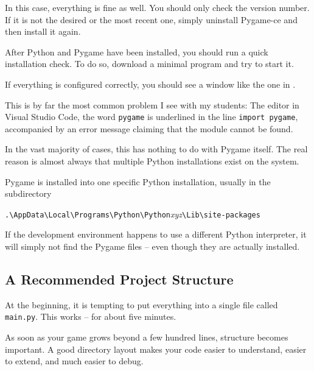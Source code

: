 In this case, everything is fine as well. You should only check the version number. If it is not the desired or the most recent one, simply uninstall Pygame-ce and then install it again.

After Python and Pygame have been installed, you should run a quick installation check. To do so, download a minimal program and try to start it.


If everything is configured correctly, you should see a window like the one in .


\begin{hintbox}
	This is by far the most common problem I see with my students: The editor in Visual Studio Code, the word \texttt{pygame} is underlined in the line \texttt{import pygame}, accompanied by an error message claiming that the module cannot be found.

	In the vast majority of cases, this has nothing to do with Pygame itself. The real reason is almost always that multiple Python installations exist on the system.

	Pygame is installed into one specific Python installation, usually in the subdirectory

	\verb+.\AppData\Local\Programs\Python\Python+\emph{xyz}\verb+\Lib\site-packages+

	If the development environment happens to use a different Python interpreter, it will simply not find the Pygame files -- even though they are actually installed.
\end{hintbox}


\subsection{A Recommended Project Structure}\label{secProjStruct}

At the beginning, it is tempting to put everything into a single file called \texttt{main.py}.
This works -- for about five minutes.

As soon as your game grows beyond a few hundred lines, structure becomes important. A good directory layout makes your code easier to understand, easier to extend, and much easier to debug.


